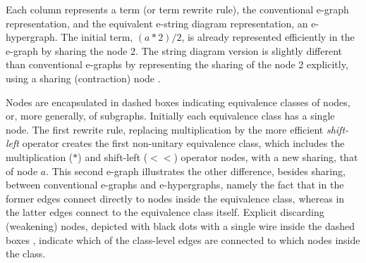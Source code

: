 Each column represents a term (or term rewrite rule), the conventional e-graph representation, and the equivalent e-string diagram representation, an e-hypergraph. 
The initial term, $(a*2)/2$, is already represented efficiently in the e-graph by sharing the node 2.
The string diagram version is slightly different than conventional e-graphs by representing the sharing of the node 2 explicitly, using a sharing (contraction) node
. 

Nodes are encapsulated in dashed boxes indicating equivalence classes of nodes, or, more generally, of subgraphs. 
Initially each equivalence class has a single node. 
The first rewrite rule, replacing multiplication by the more efficient \emph{shift-left} operator creates the first non-unitary equivalence class, which includes the multiplication ($*$) and shift-left ($<\!\!<$) operator nodes, with a new sharing, that of node $a$. 
This second e-graph illustrates the other difference, besides sharing, between conventional e-graphs and e-hypergraphs, namely the fact that in the former edges connect directly to nodes inside the equivalence class, whereas in the latter edges connect to the equivalence class itself. 
Explicit discarding (weakening) nodes, depicted with black dots with a single wire inside the dashed boxes 
, indicate which of the class-level edges are connected to which nodes inside the class. 

